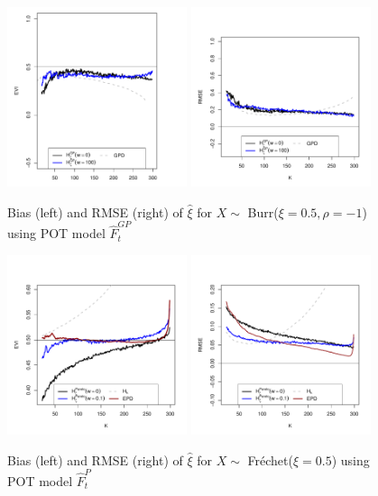 \documentclass[a4paper,11pt]{article}
\begin{document}
\begin{figure}[!ht]
  \centering
 \includegraphics[width=0.47\textwidth]{EGP_burr_xi_m16.pdf}
 \includegraphics[width=0.47\textwidth]{EGP_burr_rmse_m16.pdf}        
\caption{\small Bias (left) and RMSE (right) of $\hat{\xi}$ for $X \sim$ Burr($\xi=0.5, \rho=-1$) using POT model $\hat{F}^{GP}_t$} 
 \end{figure}


\begin{figure}[!ht]
  \centering
 \includegraphics[width=0.47\textwidth]{EP_frechet_xi_m22.pdf}
 \includegraphics[width=0.47\textwidth]{EP_frechet_rmse_m22.pdf}       
\caption{\small Bias (left) and RMSE (right) of $\hat{\xi}$ for $X \sim$ Fr\'echet($\xi=0.5$) using POT model $\hat{F}^{P}_t$} 
 \end{figure}
\end{document}
